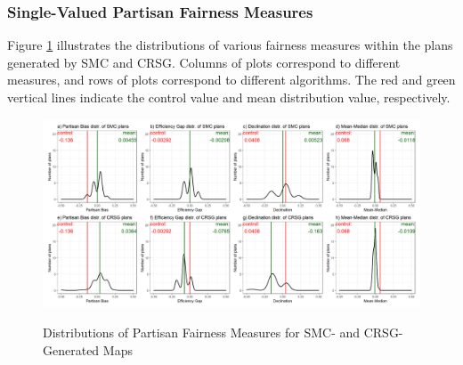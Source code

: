 \subsubsection{Single-Valued Partisan Fairness Measures}

Figure \ref{fig:fair.density} illustrates the distributions of various fairness measures within the plans generated by SMC and CRSG. Columns of plots correspond to different measures, and rows of plots correspond to different algorithms. The red and green vertical lines indicate the control value and mean distribution value, respectively. 

\begin{landscape}
    \begin{figure}[h]
        \caption{Distributions of Partisan Fairness Measures for SMC- and CRSG-Generated Maps}
        \includegraphics{img/fair.density.png}
        \label{fig:fair.density}
        \raggedright
    \end{figure}
\end{landscape}